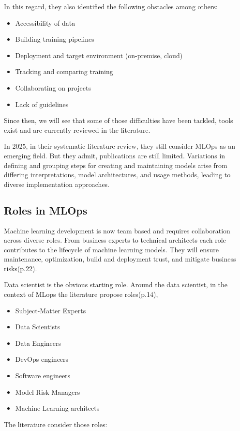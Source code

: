 In this regard, they also identified the following obstacles among others\cite{DBLP:journals/corr/abs-2103-08942}:
    \begin{itemize}
        \item Accessibility of data
        \item Building training pipelines
        \item Deployment and target environment (on-premise, cloud)
        \item Tracking and comparing training
        \item Collaborating on projects
        \item Lack of guidelines
    \end{itemize}

Since then, we will see that some of those difficulties have been tackled, tools exist and are currently reviewed in the literature.

In 2025, in their systematic literature review\cite{10855428}, they still consider MLOps as an emerging field.
But they admit, publications are still limited.
Variations in defining and grouping steps for creating and maintaining models arise from differing interpretations,
model architectures, and usage methods, leading to diverse implementation approaches.

\subsection{Roles in MLOps}\label{subsec:actors}

Machine learning development is now team based and requires collaboration across diverse roles.
From business experts to technical architects each role contributes to the lifecycle of machine learning models.
They will ensure maintenance, optimization, build and deployment trust, and mitigate business risks\cite{treveil2020introducing}(p.22).

Data scientist is the obvious starting role.
Around the data scientist, in the context of MLops the literature
propose roles\cite{treveil2020introducing}(p.14),
\begin{itemize}
    \item Subject-Matter Experts
    \item Data Scientists
    \item Data Engineers
    \item DevOps engineers
    \item Software engineers
    \item Model Risk Managers
    \item Machine Learning architects
\end{itemize}
The literature consider those roles\cite{Kreuzberger2022MachineLO}:

